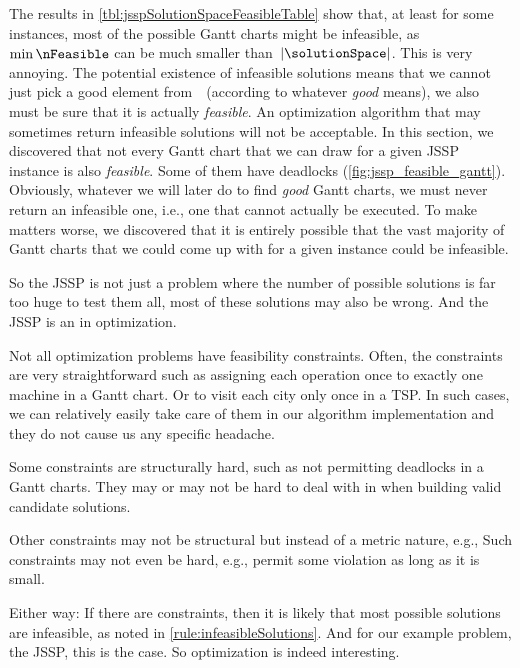 The results in \cref{tbl:jsspSolutionSpaceFeasibleTable} show that, at least for some instances, most of the possible Gantt charts might be infeasible, as~$\min\nFeasible$ can be much smaller than~$\left|\solutionSpace\right|$.
%
%
%
This is very annoying.
The potential existence of infeasible solutions means that we cannot just pick a good element from~\solutionSpace\ (according to whatever \emph{good} means), we also must be sure that it is actually \emph{feasible}.
An optimization algorithm that may sometimes return infeasible solutions will not be acceptable.%
%
\endhsection%
%
%
%
In this section, we discovered that not every Gantt chart that we can draw for a given \gls{JSSP} instance is also \emph{feasible}.
Some of them have deadlocks (\cref{fig:jssp_feasible_gantt}).
Obviously, whatever we will later do to find \emph{good} Gantt charts, we must never return an infeasible one, i.e., one that cannot actually be executed.
To make matters worse, we discovered that it is entirely possible that the vast majority of Gantt charts that we could come up with for a given instance could be infeasible.

So the \gls{JSSP} is not just a problem where the number of possible solutions is far too huge to test them all, most of these solutions may also be wrong.
And the \gls{JSSP} is an  in optimization.

Not all optimization problems have feasibility constraints.
Often, the constraints are very straightforward such as assigning each operation once to exactly one machine in a Gantt chart.
Or to visit each city only once in a \gls{TSP}.
In such cases, we can relatively easily take care of them in our algorithm implementation and they do not cause us any specific headache.

Some constraints are structurally hard, such as not permitting deadlocks in a Gantt charts.
They may or may not be hard to deal with in when building valid candidate solutions.

Other constraints may not be structural but instead of a metric nature, e.g., 
Such constraints may not even be hard, e.g., permit some violation as long as it is small.

Either way:
If there are constraints, then it is likely that most possible solutions are infeasible, as noted in \cref{rule:infeasibleSolutions}.
And for our example problem, the \gls{JSSP}, this is the case.
So optimization is indeed interesting.%
\endhsection%
\endhsection%
%

